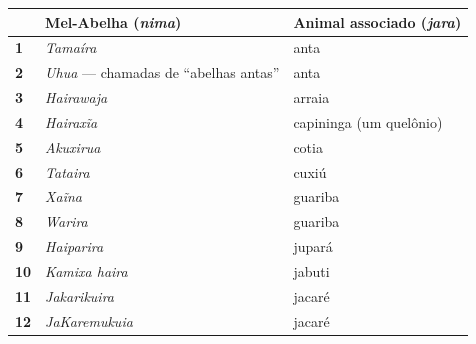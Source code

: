\begin{table}[H]
\centering
\label{my-label}
\begin{tabular}{|l|l|l|}
\hline
            & \textbf{Mel-Abelha (\emph{nima})}         & \textbf{Animal associado (\emph{jara})}                                               \\ \hline
\textbf{1}  & \textit{Tamaíra}                            & anta                                                                                    \\ \hline
\textbf{2}  & \textit{Uhua} --- chamadas de ``abelhas antas'' & anta                                                                                    \\ \hline
\textbf{3}  & \textit{Hairawaja}                          & arraia                                                                                  \\ \hline
\textbf{4}  & \textit{Hairaxĩa}                           & capininga (um quelônio)                                                                 \\ \hline
\textbf{5}  & \textit{Akuxirua}                           & cotia                                                                                   \\ \hline
\textbf{6}  & \textit{Tataira}                            & cuxiú                                                                                   \\ \hline
\textbf{7}  & \textit{Xaĩna}                             & guariba                                                                                 \\ \hline
\textbf{8}  & \textit{Warira}                             & guariba                                                                                 \\ \hline
\textbf{9}  & \textit{Haiparira}                          & jupará                                                                                  \\ \hline
\textbf{10} & \textit{Kamixa haira}                       & jabuti                                                                                  \\ \hline
\textbf{11} & \textit{Jakarikuira}                        & jacaré                                                                                  \\ \hline
\textbf{12} & \textit{JaKaremukuia}                       & jacaré                                                                                  \\ \hline

\end{tabular}
\end{table}
